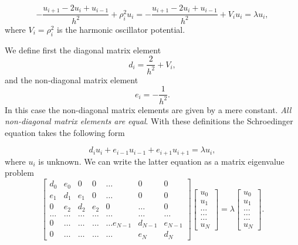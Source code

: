 \documentclass[%
oneside,                 %
final,                   %
10pt]{article}
\begin{document}
\[
-\frac{u_{i+1} -2u_i +u_{i-1}}{h^2}+\rho_i^2u_i=-\frac{u_{i+1} -2u_i +u_{i-1} }{h^2}+V_iu_i  = \lambda u_i,
\]
where $V_i=\rho_i^2$ is the harmonic oscillator potential.

We define first the diagonal matrix element
\begin{equation*}
   d_i=\frac{2}{h^2}+V_i,
\end{equation*}
and the non-diagonal matrix element
\begin{equation*}
   e_i=-\frac{1}{h^2}.
\end{equation*}
In this case the non-diagonal matrix elements are given by a mere constant.
\emph{All non-diagonal matrix elements are equal}.
With these definitions the Schroedinger equation takes the following form

\begin{equation*}
d_iu_i+e_{i-1}u_{i-1}+e_{i+1}u_{i+1}  = \lambda u_i,
\end{equation*}
where $u_i$ is unknown. We can write the 
latter equation as a matrix eigenvalue problem
\begin{equation}
    \begin{bmatrix}d_0 & e_0 & 0   & 0    & \dots  &0     & 0 \\
                                e_1 & d_1 & e_1 & 0    & \dots  &0     &0 \\
                                0   & e_2 & d_2 & e_2  &0       &\dots & 0\\
                                \dots  & \dots & \dots & \dots  &\dots      &\dots & \dots\\
                                0   & \dots & \dots & \dots  &\dots  e_{N-1}     &d_{N-1} & e_{N-1}\\
                                0   & \dots & \dots & \dots  &\dots       &e_{N} & d_{N}
             \end{bmatrix}  \begin{bmatrix} u_{0} \\
                                                              u_{1} \\
                                                              \dots\\ \dots\\ \dots\\
                                                              u_{N}
             \end{bmatrix}=\lambda \begin{bmatrix} u_{0} \\
                                                              u_{1} \\
                                                              \dots\\ \dots\\ \dots\\
                                                              u_{N}
             \end{bmatrix}.  
      \label{eq:sematrix}
\end{equation}
\end{document}
